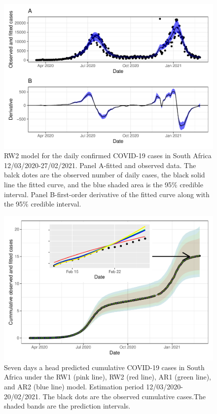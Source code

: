 \documentclass[10pt,letterpaper]{article}
\begin{document}
\begin{figure}[H]
	\includegraphics[width=0.95\linewidth]{COVIDincidenceSA_files/figure-latex/unnamed-chunk-7-1} \caption{RW2 model for the daily confirmed COVID-19 cases in South Africa 12/03/2020-27/02/2021.  Panel A-fitted and observed data. The balck dotes are the observed number of daily cases, the black solid line the fitted curve, and the blue shaded area is the 95\% credible interval. Panel B-first-order derivative of the fitted curve along with the 95\% credible interval.}\label{fig:unnamed-chunk-7}
\end{figure}


\begin{figure}[H]
\includegraphics[width=0.95\linewidth]{COVIDincidenceSA_files/figure-latex/predd-1} \caption{Seven days a head predicted cumulative COVID-19 cases in South Africa under the RW1 (pink line), RW2 (red line), AR1 (green line), and AR2 (blue line) model. Estimation period 12/03/2020-20/02/2021. The black dots are the observed cumulative cases.The shaded bands are the prediction intervals. }\label{fig:predd}
\end{figure}
\end{document}
